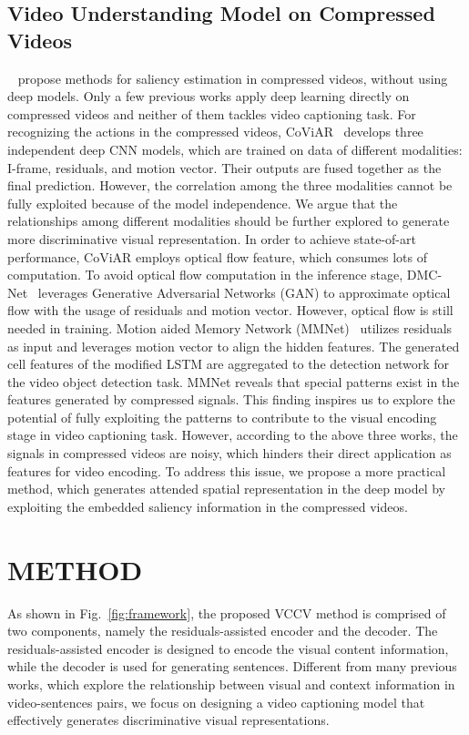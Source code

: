\documentclass[a4paper,conference]{IEEEtran}
\begin{document}
\subsection{Video Understanding Model on Compressed Videos}
~\cite{zhang2018video, khatoonabadi2017compressed} propose methods for saliency estimation in compressed videos, without using deep models. Only a few previous works apply deep learning directly on compressed videos and neither of them tackles video captioning task. For recognizing the actions in the compressed videos, CoViAR~\cite{wu2018compressed} develops three independent deep CNN models, which are trained on data of different modalities: I-frame, residuals, and motion vector. Their outputs are fused together as the final prediction. However, the correlation among the three modalities cannot be fully exploited because of the model independence. We argue that the relationships among different modalities should be further explored to generate more discriminative visual representation. In order to achieve state-of-art performance, CoViAR employs optical flow feature, which consumes lots of computation. To avoid optical flow computation in the inference stage, DMC-Net~\cite{shou2019dmc} leverages Generative Adversarial Networks (GAN) to approximate optical flow with the usage of residuals and motion vector. However, optical flow is still needed in training. Motion aided Memory
Network (MMNet)~\cite{wang2019fast} utilizes residuals as input and leverages motion vector to align the hidden features. The generated cell features of the modified LSTM are aggregated to the detection network for the video object detection task. MMNet reveals that special patterns exist in the features generated by compressed signals. This finding inspires us to explore the potential of fully exploiting the patterns to contribute to the visual encoding stage in video captioning task. However, according to the above three works, the signals in compressed videos are noisy, which hinders their direct application as features for video encoding. To address this issue, we propose a more practical method, which generates attended spatial representation in the deep model by exploiting the embedded saliency information in the compressed videos.


\section{METHOD}
As shown in Fig.~\ref{fig:framework}, the proposed VCCV method is comprised of two components, namely the residuals-assisted encoder and the decoder. The residuals-assisted encoder is designed to encode the visual content information, while the decoder is used for generating sentences. Different from many previous works, which explore the relationship between visual and context information in video-sentences pairs, we focus on designing a video captioning model that effectively generates discriminative visual representations. %
\end{document}
